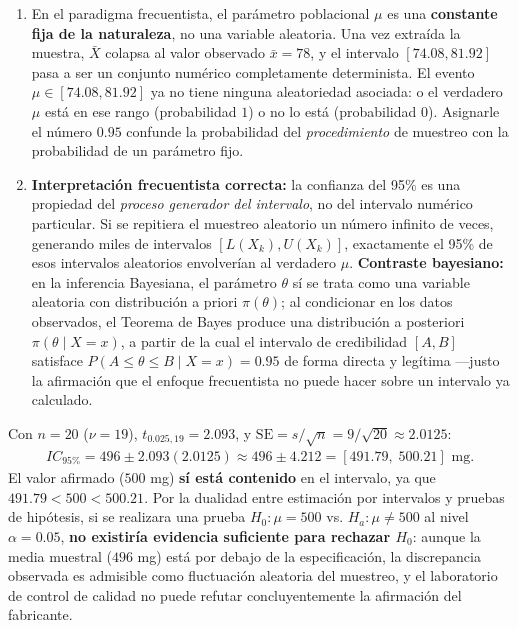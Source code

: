 \begin{solproblema}[prob:a3ef454]
	\begin{enumerate}
		\item En el paradigma frecuentista, el parámetro poblacional $\mu$ es una \textbf{constante fija de la naturaleza}, no una variable aleatoria. Una vez extraída la muestra, $\bar{X}$ colapsa al valor observado $\bar{x}=78$, y el intervalo $[74.08,81.92]$ pasa a ser un conjunto numérico completamente determinista. El evento $\mu\in[74.08,81.92]$ ya no tiene ninguna aleatoriedad asociada: o el verdadero $\mu$ está en ese rango (probabilidad $1$) o no lo está (probabilidad $0$). Asignarle el número $0.95$ confunde la probabilidad del \emph{procedimiento} de muestreo con la probabilidad de un parámetro fijo.
		\item \textbf{Interpretación frecuentista correcta:} la confianza del 95\% es una propiedad del \emph{proceso generador del intervalo}, no del intervalo numérico particular. Si se repitiera el muestreo aleatorio un número infinito de veces, generando miles de intervalos $[L(X_k),U(X_k)]$, exactamente el 95\% de esos intervalos aleatorios envolverían al verdadero $\mu$. \textbf{Contraste bayesiano:} en la inferencia Bayesiana, el parámetro $\theta$ sí se trata como una variable aleatoria con distribución a priori $\pi(\theta)$; al condicionar en los datos observados, el Teorema de Bayes produce una distribución a posteriori $\pi(\theta\mid X=x)$, a partir de la cual el intervalo de credibilidad $[A,B]$ satisface $P(A\le\theta\le B\mid X=x)=0.95$ de forma directa y legítima —justo la afirmación que el enfoque frecuentista no puede hacer sobre un intervalo ya calculado.
	\end{enumerate}
\end{solproblema}

\begin{solproblema}[prob:18d6b96]
	Con $n=20$ ($\nu=19$), $t_{0.025,19}=2.093$, y $\text{SE}=s/\sqrt{n}=9/\sqrt{20}\approx2.0125$:
	\begin{align}
		IC_{95\%} = 496 \pm 2.093(2.0125) \approx 496 \pm 4.212 = [491.79,\;500.21] \text{ mg.}
	\end{align}
	El valor afirmado ($500$ mg) \textbf{sí está contenido} en el intervalo, ya que $491.79 < 500 < 500.21$. Por la dualidad entre estimación por intervalos y pruebas de hipótesis, si se realizara una prueba $H_0:\mu=500$ vs. $H_a:\mu\neq500$ al nivel $\alpha=0.05$, \textbf{no existiría evidencia suficiente para rechazar $H_0$}: aunque la media muestral ($496$ mg) está por debajo de la especificación, la discrepancia observada es admisible como fluctuación aleatoria del muestreo, y el laboratorio de control de calidad no puede refutar concluyentemente la afirmación del fabricante.
\end{solproblema}
